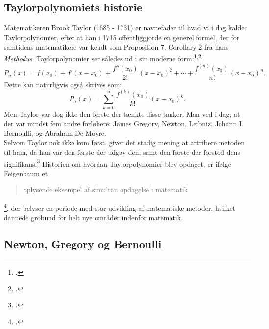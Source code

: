 \documentclass[12pt, a4paper]{article}
\begin{document}
\begin{refsection}
\section{Taylorpolynomiets historie} %
Matematikeren Brook Taylor (1685 - 1731) er navnefader til hvad vi i dag kalder Taylorpolynomier, efter at han i 1715 offentliggjorde en generel formel, der for samtidens matematikere var kendt som Proposition 7, Corollary 2 fra hans \textit{Methodus}.
Taylorpolynomier ser således ud i sin moderne form:\footcite[s. 247]{roy_2021}$^,$\footcite[s. 72]{feigenbaum_exact_sciences}
\begin{equation*}
   P_n(x)=f(x_0)+f'(x-x_0)+\frac{f''(x_0)}{2!}(x-x_0)^2+\cdots +\frac{f^{(n)}(x_0)}{n!}(x-x_0)^n. 
\end{equation*}
Dette kan naturligvis også skrives som:
\begin{equation*}
    P_n(x)=\sum_{k=0}^{n}\frac{f^{(k)}(x_0)}{k!}(x-x_0)^k.
\end{equation*}
Men Taylor var dog ikke den første der tænkte disse tanker. Man ved i dag, at der var mindst fem andre forløbere: James Gregory, Newton, Leibniz, Johann I. Bernoulli, og Abraham De Movre.\\
Selvom Taylor nok ikke kom først, giver det stadig mening at attribere metoden til ham, da han var den første der udgav den, samt den første der forstod dens signifikans.\footcite[s. 196]{alma99122953280205763} Historien om hvordan Taylorpolynomier blev opdaget, er ifølge Feigenbaum et \blockquote{oplysende eksempel af simultan opdagelse i matematik}\footcite[s. 112]{alma99122953280205763}, der belyser en periode med stor udvikling af matematiske metoder, hvilket dannede grobund for helt nye områder indenfor matematik.
\subsection{Newton, Gregory og Bernoulli}


\end{refsection}
\end{document}
